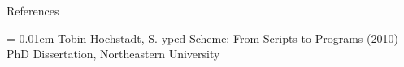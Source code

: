 \documentclass[landscape,final,a0paper,fontscale=0.277]{baposter}
\begin{document}
\begin{poster}
\begin{posterbox}[name=references,column=2,below=conclusion]{References}
  \smaller
  
  \renewcommand{\section}[2]{\vskip 0.05em}
  \begin{thebibliography}{1}\itemsep=-0.01em
    \setlength{\baselineskip}{0.4em}
    Tobin-Hochstadt, S.
    yped {S}cheme: {F}rom {S}cripts to {P}rograms (2010)
    \newblock PhD Dissertation,
    \newblock Northeastern University
  \end{thebibliography}
  \vspace{0.3em}

\end{posterbox}

\end{poster}
\end{document}
